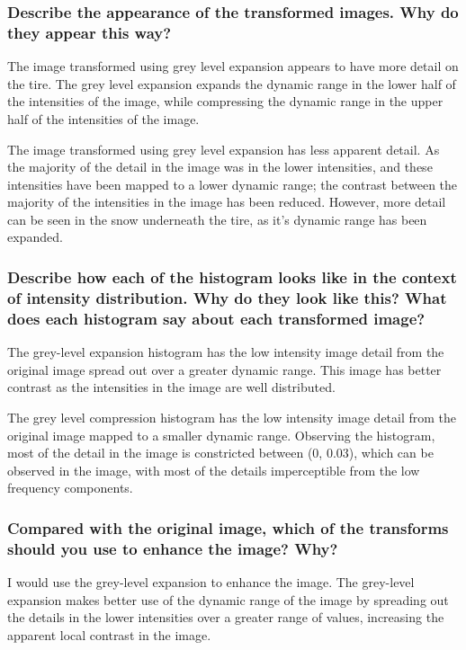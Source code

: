 \documentclass[article, 1.5space, letterpaper, 12pt, oneside, header, footer]{SydeClass}
\begin{document}
\subsubsection{Describe the appearance of the transformed images. Why do they appear this way?}

The image transformed using grey level expansion appears to have more detail on the tire. The grey level expansion expands the dynamic range in the lower half of the intensities of the image, while compressing the dynamic range in the upper half of the intensities of the image.

The image transformed using grey level expansion has less apparent detail. As the majority of the detail in the image was in the lower intensities, and these intensities have been mapped to a lower dynamic range; the contrast between the majority of the intensities in the image has been reduced. However, more detail can be seen in the snow underneath the tire, as it's dynamic range has been expanded.

\subsubsection{Describe how each of the histogram looks like in the context of intensity distribution. Why do they look like this? What does each histogram say about each transformed image?}

The grey-level expansion histogram has the low intensity image detail from the original image spread out over a greater dynamic range. This image has better contrast as the intensities in the image are well distributed.

The grey level compression histogram has the low intensity image detail from the original image mapped to a smaller dynamic range. Observing the histogram, most of the detail in the image is constricted between (0, 0.03), which can be observed in the image, with most of the details imperceptible from the low frequency components.

\subsubsection{Compared with the original image, which of the transforms should you use to enhance the image? Why?}

I would use the grey-level expansion to enhance the image. The grey-level expansion makes better use of the dynamic range of the image by spreading out the details in the lower intensities over a greater range of values, increasing the apparent local contrast in the image.
\end{document}

